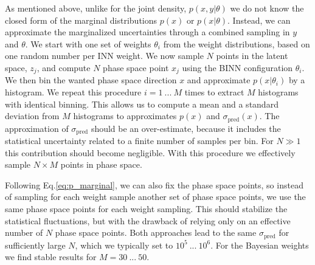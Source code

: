 As mentioned above, unlike for the joint density, $p(x, y | \theta)$
we do not know the closed form of the marginal distributions $p(x)$ or
$p(x| \theta)$. Instead, we can approximate the marginalized
uncertainties through a combined sampling in $y$ and $\theta$.  We
start with one set of weights $\theta_i$ from the weight
distributions, based on one random number per INN weight. We now
sample $N$ points in the latent space, $z_j$, and compute $N$ phase
space point $x_j$ using the BINN configuration $\theta_i$. We then bin
the wanted phase space direction $x$ and approximate $p(x|\theta_i)$
by a histogram. We repeat this procedure $i=1~...~M$ times to extract
$M$ histograms with identical binning. This allows us to compute a
mean and a standard deviation from $M$ histograms to approximates
$p(x)$ and $\sigma_\text{pred}(x)$. The approximation of
$\sigma_\text{pred}$ should be an over-estimate, because it includes
the statistical uncertainty related to a finite number of samples per
bin.  For $N \gg 1$ this contribution should become negligible. With
this procedure we effectively sample $N \times M$ points in phase
space.

Following Eq.\eqref{eq:p_marginal}, we can also fix the phase space
points, so instead of sampling for each weight sample another set of
phase space points, we use the same phase space points for each weight
sampling. This should stabilize the statistical fluctuations, but with
the drawback of relying only on an effective number of $N$ phase space
points. Both approaches lead to the same $\sigma_\text{pred}$ for
sufficiently large $N$, which we typically set to $10^5~...~10^6$. For
the Bayesian weights we find stable results for $M=30~...~50$.

